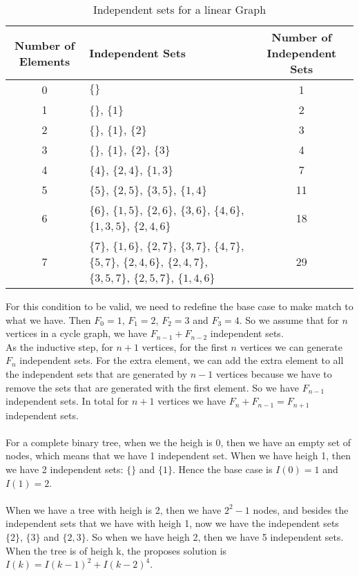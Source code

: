 \documentclass[tikz, 12pt]{scrartcl}
\begin{document}
\begin{enumerate}
\begin{longtable}{|c|p{5cm}|c|}
\caption{Independent sets for a linear Graph\label{linearGraph}}\\
\hline
Number of Elements	&	Independent Sets	&	Number of Independent Sets\\
\hline
	0			&	$\{\}$													&	1		\\
	\hline
	1			&	$\{\}$, $\{1\}$												&	2		\\
	\hline
	2			&	$\{\}$, $\{1\}$, $\{2\}$											&	3		\\
	\hline
	3			&	$\{\}$, $\{1\}$, $\{2\}$, $\{3\}$									&	4		\\
	\hline
	4			&	$\{4\}$, $\{2,4\}$, $\{1, 3\}$									&	7	\\
	\hline
	5			&	$\{5\}$, $\{2, 5\}$, $\{3, 5\}$, $\{1, 4\}$							&	11	\\
	\hline
	6			&	$\{6\}$, $\{1, 5\}$, $\{2, 6\}$, $\{3, 6\}$, $\{4, 6\}$, $\{1, 3, 5\}$, $\{2, 4, 6\}$	&	18\\
	\hline
	7			&	$\{7\}$, $\{1, 6\}$, $\{2, 7\}$, $\{3, 7\}$, $\{4, 7\}$, $\{5, 7\}$, $\{2, 4, 6\}$, $\{ 2, 4, 7\}$, $\{3, 5, 7\}$, $\{2, 5, 7\}$, $\{1, 4, 6\}$ 	&  29\\
\hline
\end{longtable}	 	

For this condition to be valid, we need to redefine the base case to make match to what we have. Then $F_0 = 1$, $F_1 = 2$, $F_2 =3$ and $F_3 = 4$. So we assume that for $n$ vertices in a cycle graph, we have $F_{n - 1} + F_{n- 2}$ independent sets.\\
As the inductive step, for $n + 1$ vertices, for the first $n$ vertices we can generate $F_{n}$ independent sets. For the extra element, we can add the extra element to all the independent sets that are generated by $n-1$ vertices because we have to remove the sets that are generated with the first element. So we have $F_{n -1}$ independent sets. In total for $n + 1$ vertices we have $F_{n} + F_{n - 1} = F_{n + 1}$ independent sets.\\
\\
For a complete binary tree, when we the heigh is 0, then we have an empty set of nodes, which means that we have 1 independent set. When we have heigh 1, then we have 2 independent sets: $\{\}$ and $\{1\}$. Hence the base case is $I(0) = 1$ and $I(1) = 2$. 	\\
\\
When we have a tree with heigh is 2, then we have $2^2 - 1$ nodes, and besides the independent sets that we have with heigh 1, now we have the independent sets $\{2\}$, $\{3\}$ and $\{2, 3\}$. So when we have heigh 2, then we have 5 independent sets. When the tree is of heigh k, the proposes solution is $I(k) = I(k - 1)^2 + I(k - 2)^4$.


\end{enumerate}
\end{document}
